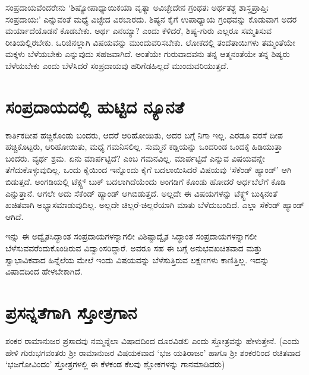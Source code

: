 ಸಂಪ್ರದಾಯವೆಂದರೇನು `ಶಿಷ್ಯೋಪಾಧ್ಯಾಯಿಕಯಾ ವೃತ್ಯಾ  ಅವಿಚ್ಛೇದೇನ ಗ್ರಂಥತಃ ಅರ್ಥತಶ್ಜ ಶಾಸ್ತ್ರಪ್ರಾಪ್ತಿಃ ಸಂಪ್ರದಾಯಃ' ಎನ್ನುವಂತೆ ಮಧ್ಯೆ ವಿಚ್ಛೇದ ವಿರಬಾರದು. ಶಿಷ್ಯನ ಕೈಗೆ ಉಪಾಧ್ಯಾಯ ಗ್ರಂಥವನ್ನು ಕೊಡುವಾಗ ಅದರ ಮರ್ಯಾದೆಯೊಡನೆ ಕೊಡಬೇಕು. ಅರ್ಥ ಎನಯ್ಯಾ? ಎಂದು ಕೆಳಿದರೆ, ಶಿಷ್ಯ-ಗುರು ಎಲ್ಲರೂ ಸಮ್ಮತಿಸುವ ರೀತಿಯಲ್ಲಿರಬೇಕು. ಒರಿಜಿನಲ್ಲಾಗಿ ವಿಷಯವನ್ನು ಮುಂದುವರಿಸಬೇಕು. ಲೋಕದಲ್ಲಿ ತಂದೆತಾಯಿಗಳು ತಮ್ಮಂತೆಯೇ ಮಕ್ಕಳು ಬೆಳೆಯಬೇಕು ಎನ್ನುವುದು ಸಹಜವಾಗಿದೆ. ಅಂತೆಯೇ ಗುರುವಾದವನು ತನ್ನ ಆತ್ಮನಂತೆಯೇ ತನ್ನ ಶಿಷ್ಯರು ಬೆಳೆಯಬೇಕು ಎಂದು ಬೆಳೆಸಿದರೆ ಸಂಪ್ರದಾಯವು ಹರಿಗೆಡಹಿಲ್ಲದೆ ಮುಂದುವರಿಯುತ್ತದೆ. 

\section*{ಸಂಪ್ರದಾಯದಲ್ಲಿ ಹುಟ್ಟಿದ ನ್ಯೂನತೆ}

ಕಾರ್ತಿಕದೀಪ ಹಚ್ಚಿಕೊಂಡು ಬಂದರು, ಆದರೆ ಆರಿಹೋಯಿತು, ಅದರ ಬಗ್ಗೆ ನಿಗಾ ಇಲ್ಲ. ಎರಡೂ ವರಸೆ ದೀಪ ಹಚ್ಚಿಕೊಟ್ಟರು, ಆರಿಹೋಯಿತು, ಮಧ್ಯೆ ಗಮನಿಸಲಿಲ್ಲ. ಸುಮ್ಮನೆ ಕಡ್ಡಿಯನ್ನು ಒಂದರಿಂಡ ಒಂದಕ್ಕೆ ಹಿಡಿಯುತ್ತಾ ಬಂದರು. ವ್ಯರ್ಥ ಶ್ರಮ. ಏನು ಮಾರ್ಪಟ್ಟಿದೆ? ಎಂಬ ಗಮನವಿಲ್ಲ. ಮಾರ್ಪಟ್ಟಿದೆ ಎನ್ನುವ ವಿಷಯವನ್ನೇ ತೆಗೆದುಕೊಳ್ಳುವುದಿಲ್ಲ. ಒಂದು ಕೈಯಿಂದ ಇನ್ನೊಂದು ಕೈಗೆ ಬದಲಾಯಿಸಿದರೆ ವಿಷಯವು `ಸೆಕೆಂಡ್ ಹ್ಯಾಂಡ್' ಆಗಿ ಬಿಡುತ್ತದೆ. ಅಂಗಡಿಯಲ್ಲಿ ಟೆಕ್ಸ್ಟ್  ಬುಕ್ ಬದಲಾಗಿದೆಯೆಂದು ಅಂಗಡಿಗೆ ಕೊಂಡು ಹೋದರೆ ಅರ್ಧಬೆಲೆಗೆ ಕೊಡಿ ಎನ್ನುತ್ತಾನೆ. ಆಗಲೇ ಅದು ಸೆಕೆಂಡ್ ಹ್ಯಾಂಡ್ ಆಗಿಬಿಡುತ್ತದೆ. ಅಲ್ಲದೇ ಈ ವಿಷಯಗಳನ್ನು ಟೆಕ್ಸ್ಟ್ ಬುಕ್ಕಿನಂತೆ ಖಚಿತವಾಗಿ ಅಭ್ಯಾಸಮಾಡುವುದಿಲ್ಲ. ಅಲ್ಲದೇ ಚಿಲ್ಲರೆ-ಚಿಲ್ಲರೆಯಾಗಿ ಮಾತು ಬೆಳೆದುಬಂದಿದೆ. ಎಲ್ಲಾ ಸೆಕೆಂಡ್ ಹ್ಯಾಂಡ್ ಆಗಿದೆ.

ಇನ್ನು ಈ ಅದ್ವೈತಸಿದ್ಧಾಂತ ಸಂಪ್ರದಾಯಗಳನ್ನಾಗಲೀ ವಿಶಿಷ್ಟಾದ್ವೈತ ಸಿದ್ಧಾಂತ ಸಂಪ್ರದಾಯಗಳನ್ನಾಗಲೀ ಬೆಳೆಸುವವರೆಂದುಕೊಂಡಿರುವ ವಿದ್ವಾಂಸರಿದ್ದಾರೆ. ಅವರೂ ಸಹ ಈ ಬಗ್ಗೆ ಅನುಭವಖಚಿತವಾದ ಮತ್ತು ಸ್ವಾಭಾವಿಕವಾದ ಹಿನ್ನೆಲೆಯ ಮೇಲೆ ಇಂದು ವಿಷಯವನ್ನು ಬೆಳೆಸುತ್ತಿರುವ ಲಕ್ಷಣಗಳು ಕಾಣಿತ್ತಿಲ್ಲ. ಇದನ್ನು ವಿಷಾದದಿಂದ ಹೇಳಬೇಕಾಗಿದೆ.

\section*{ಪ್ರಸನ್ನತೆಗಾಗಿ ಸ್ತೋತ್ರಗಾನ}

ಶಂಕರ ರಾಮಾನುಜರ ಪ್ರಸಾದವು ನಮ್ಮನ್ನೆಲಾ ವಿಷಾದದಿಂದ ದೂರವಿಡಲಿ ಎಂದು ಸ್ತೋತ್ರವನ್ನು ಹೇಳುತ್ತೇನೆ. (ಎಂದು ಹೇಳಿ ಗುರುಭಗವಂತರು ಶ್ರೀ ರಾಮಾನುಜರ ವಿಷಯಕವಾದ `ಭಜ ಯತಿರಾಜಂ' ಹಾಗೂ ಶ್ರೀ ಶಂಕರರಿಂದ ರಚಿತವಾದ `ಭಜಗೋವಿಂದಂ' ಸ್ತೋತ್ರಗಳಲ್ಲಿ ಈ ಕೆಳಕಂಡ ಕೆಲವು ಶ್ಲೋಕಗಳನ್ನು ಗಾನಮಾಡಿದರು)

